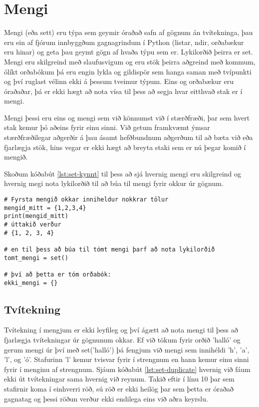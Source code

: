 
\chapter{Mengi}\label{k:sett}
Mengi (eða sett) eru týpa sem geymir óraðað safn af gögnum án tvítekninga, þau eru ein af fjórum innbyggðum gagnagrindum í Python (listar, ndir, orðabækur eru hinar) og geta þau geymt gögn af hvaða týpu sem er.
Lykilorðið þeirra er set.
Mengi eru skilgreind með slaufusvigum og eru stök þeirra aðgreind með kommum, ólíkt orðabókum þá eru engin lykla og gildispör sem hanga saman með tvípunkti og því ruglast vélinn ekki á þessum tveimur týpum.
Eins og orðabækur eru óraðaðar, þá er ekki hægt að nota vísa til þess að segja hvar eitthvað stak er í mengi.

Mengi þessi eru eins og mengi sem við könnumst við í stærðfræði, þar sem hvert stak kemur þó aðeins fyrir einu sinni.
Við getum framkvæmt ýmsar stærðfræðilegar aðgerðir á þau ásamt hefðbundnum aðgerðum til að bæta við eða fjarlægja stök, hins vegar er ekki hægt að breyta staki sem er nú þegar komið í mengið.

Skoðum kóðabút \ref{lst:set-kynnt} til þess að sjá hvernig mengi eru skilgreind og hvernig megi nota lykilorðið til að búa til mengi fyrir okkur úr gögnum.

\begin{lstlisting}[caption=Mengi skilgreind, label=lst:set-kynnt]
# Fyrsta mengið okkar inniheldur nokkrar tölur
mengid_mitt = {1,2,3,4}
print(mengid_mitt)
# úttakið verður 
# {1, 2, 3, 4}

# en til þess að búa til tómt mengi þarf að nota lykilorðið
tomt_mengi = set()

# því að þetta er tóm orðabók:
ekki_mengi = {}
\end{lstlisting}

\section{Tvítekning}
Tvítekning í mengjum er ekki leyfileg og því ágætt að nota mengi til þess að fjarlægja tvítekningar úr gögnunum okkar.
Ef við tökum fyrir orðið 'halló' og gerum mengi úr því með set('halló') þá fengjum við mengi sem innihéldi 'h', 'a', 'l', og 'ó'.
Stafurinn 'l' kemur tvisvar fyrir í strengnum en hann kemur einu sinni fyrir í menginu af strengnum.
Sjáum kóðabút \ref{lst:set-duplicate} hvernig við fáum ekki út tvítekningar sama hvernig við reynum.
Takið eftir í línu 10 þar sem stafirnir koma í einhverri röð, sú röð er ekki heilög þar sem þetta er óraðað gagnatag og þessi röðun verður ekki endilega eins við aðra keyrslu.

